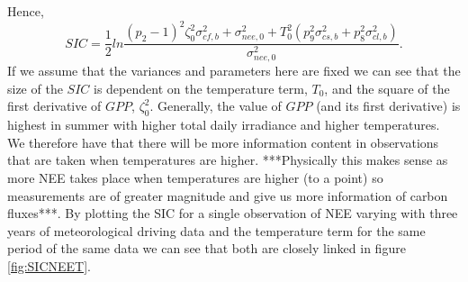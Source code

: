 \documentclass[11pt]{article}
\begin{document}
Hence,
\[
SIC = \frac{1}{2}ln\frac{(p_{2}-1)^{2}\zeta_0^{2}\sigma_{cf,b}^{2}+\sigma_{nee,0}^{2}+T_{0}^2(p_{9}^2\sigma_{cs,b}^2+p_8^2\sigma_{cl,b}^2)}{\sigma_{nee,0}^{2}}.
\]
If we assume that the variances and parameters here are fixed we can see that the size of the $SIC$ is dependent on the temperature term, $T_0$, and the square of the first derivative of $GPP$, $\zeta_0^{2}$. Generally, the value of $GPP$ (and its first derivative) is highest in summer with higher total daily irradiance and higher temperatures. We therefore have that there will be more information content in observations that are taken when temperatures are higher. ***Physically this makes sense as more NEE takes place when temperatures are higher (to a point) so measurements are of greater magnitude and give us more information of carbon fluxes***. By plotting the SIC for a single observation of NEE varying with three years of meteorological driving data and the temperature term for the same period of the same data we can see that both are closely linked in figure \ref{fig:SICNEET}.
\end{document}
